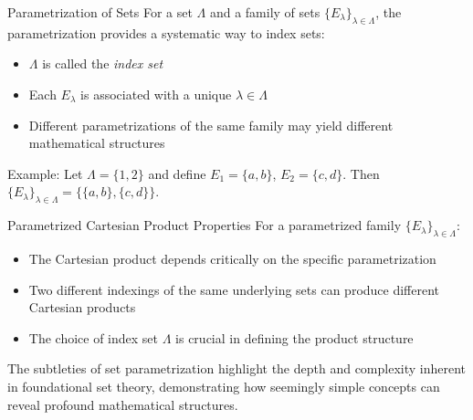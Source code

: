 \documentclass[12pt,a4paper]{article}
\begin{document}
\begin{definitionbox}{Parametrization of Sets}
For a set $\Lambda$ and a family of sets $\{E_{\lambda}\}_{\lambda\in\Lambda}$, the parametrization provides a systematic way to index sets:

\begin{itemize}
    \item $\Lambda$ is called the \textit{index set}
    \item Each $E_{\lambda}$ is associated with a unique $\lambda \in \Lambda$
    \item Different parametrizations of the same family may yield different mathematical structures
\end{itemize}

Example: Let $\Lambda = \{1,2\}$ and define $E_1 = \{a,b\}$, $E_2 = \{c,d\}$. Then $\{E_{\lambda}\}_{\lambda\in\Lambda} = \{\{a,b\}, \{c,d\}\}$.
\end{definitionbox}

\begin{theorembox}{Parametrized Cartesian Product Properties}
For a parametrized family $\{E_{\lambda}\}_{\lambda\in\Lambda}$:

\begin{itemize}
    \item The Cartesian product depends critically on the specific parametrization
    \item Two different indexings of the same underlying sets can produce different Cartesian products
    \item The choice of index set $\Lambda$ is crucial in defining the product structure
\end{itemize}
\end{theorembox}

\begin{note}
The subtleties of set parametrization highlight the depth and complexity inherent in foundational set theory, demonstrating how seemingly simple concepts can reveal profound mathematical structures.
\end{note}
\end{document}
